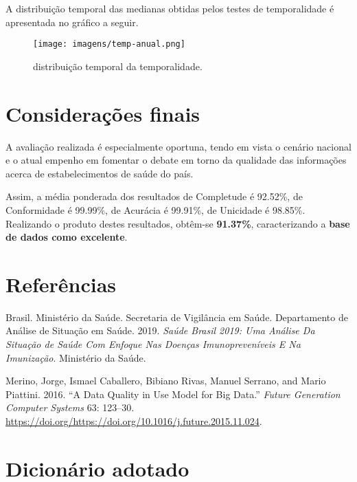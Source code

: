 \documentclass[
  12,
  table]{proadi}
\begin{document}
A distribuição temporal das medianas obtidas pelos testes de
temporalidade é apresentada no gráfico a seguir.

\begin{figure}
\centering
\texttt{[image: imagens/temp-anual.png]}
\caption{distribuição temporal da temporalidade.}
\end{figure}

\hypertarget{considerauxe7uxf5es-finais}{%
\section{Considerações finais}\label{considerauxe7uxf5es-finais}}

A avaliação realizada é especialmente oportuna, tendo em vista o cenário
nacional e o atual empenho em fomentar o debate em torno da qualidade
das informações acerca de estabelecimentos de saúde do país.

Assim, a média ponderada dos resultados de Completude é 92.52\%, de
Conformidade é 99.99\%, de Acurácia é 99.91\%, de Unicidade é 98.85\%.
Realizando o produto destes resultados, obtêm-se \textbf{91.37\%},
caracterizando a \textbf{base de dados como excelente}.

\newpage

\hypertarget{referuxeancias}{%
\section{Referências}\label{referuxeancias}}

\hypertarget{refs}{}
\leavevmode\hypertarget{ref-brasil2019}{}%
Brasil. Ministério da Saúde. Secretaria de Vigilância em Saúde.
Departamento de Análise de Situação em Saúde. 2019. \emph{Saúde Brasil
2019: Uma Análise Da Situação de Saúde Com Enfoque Nas Doenças
Imunopreveníveis E Na Imunização}. Ministério da Saúde.

\leavevmode\hypertarget{ref-merino}{}%
Merino, Jorge, Ismael Caballero, Bibiano Rivas, Manuel Serrano, and
Mario Piattini. 2016. ``A Data Quality in Use Model for Big Data.''
\emph{Future Generation Computer Systems} 63: 123--30.
\url{https://doi.org/https://doi.org/10.1016/j.future.2015.11.024}.

\captionsetup[table]{labelformat=empty}

\newpage

\hypertarget{dicionuxe1rio-adotado}{%
\section*{Dicionário adotado}\label{dicionuxe1rio-adotado}}
\end{document}
